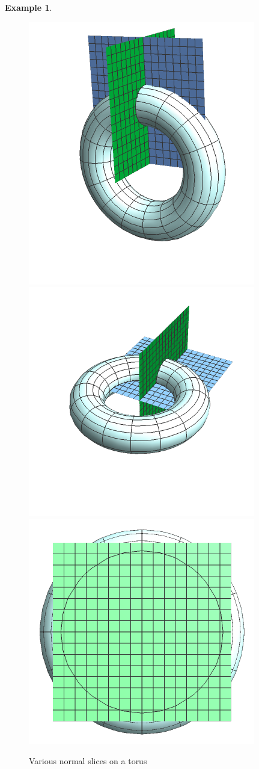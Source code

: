 \documentclass{UKZNcomp}
\theoremstyle{definition}
\newtheorem{example}[definition]{Example}
\theoremstyle{remark}
\begin{document}
\begin{example}
\begin{figure}[H]
    \centerline{\includegraphics[scale=0.9]{outTorusSm}\includegraphics[scale=0.9]{innertorusSm}\includegraphics[scale=0.9]{toptorus}}
    \caption[Various Normal Slices on a Torus]{\label{fig:normaltorus}
    Various normal slices on a torus}
\end{figure}
\end{example}
\end{document}
